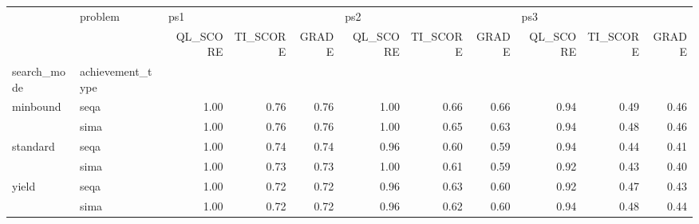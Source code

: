 \begin{tabular}{llrrrrrrrrr}
\toprule
      & problem & \multicolumn{3}{l}{ps1} & \multicolumn{3}{l}{ps2} & \multicolumn{3}{l}{ps3} \\
      & {} & QL\_SCORE & TI\_SCORE & GRADE & QL\_SCORE & TI\_SCORE & GRADE & QL\_SCORE & TI\_SCORE & GRADE \\
search\_mode & achievement\_type &          &          &       &          &          &       &          &          &       \\
\midrule
minbound & seqa &     1.00 &     0.76 &  0.76 &     1.00 &     0.66 &  0.66 &     0.94 &     0.49 &  0.46 \\
      & sima &     1.00 &     0.76 &  0.76 &     1.00 &     0.65 &  0.63 &     0.94 &     0.48 &  0.46 \\
standard & seqa &     1.00 &     0.74 &  0.74 &     0.96 &     0.60 &  0.59 &     0.94 &     0.44 &  0.41 \\
      & sima &     1.00 &     0.73 &  0.73 &     1.00 &     0.61 &  0.59 &     0.92 &     0.43 &  0.40 \\
yield & seqa &     1.00 &     0.72 &  0.72 &     0.96 &     0.63 &  0.60 &     0.92 &     0.47 &  0.43 \\
      & sima &     1.00 &     0.72 &  0.72 &     0.96 &     0.62 &  0.60 &     0.94 &     0.48 &  0.44 \\
\bottomrule
\end{tabular}

